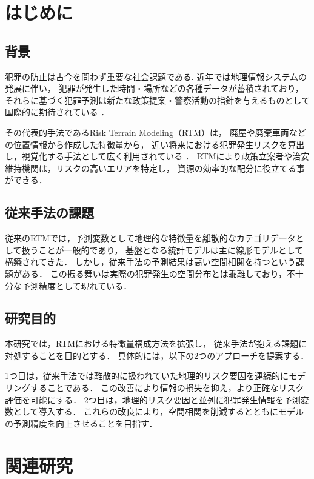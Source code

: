 \section{はじめに}
\subsection{背景}
犯罪の防止は古今を問わず重要な社会課題である.
近年では地理情報システムの発展に伴い，
犯罪が発生した時間・場所などの各種データが蓄積されており\cite{ChicagoDataPortal}，
それらに基づく犯罪予測は新たな政策提案・警察活動の指針を与えるものとして国際的に期待されている
\cite{犯罪予測}．

その代表的手法であるRisk Terrain Modeling（RTM）\cite{caplan2015risk}は，
廃屋や廃棄車両などの位置情報から作成した特徴量から，
近い将来における犯罪発生リスクを算出し，視覚化する手法として広く利用されている
\cite{地理的犯罪予測研究の潮流}．
RTMにより政策立案者や治安維持機関は，リスクの高いエリアを特定し，
資源の効率的な配分に役立てる事ができる\cite{犯罪予測}．

\subsection{従来手法の課題}
従来のRTMでは，予測変数として地理的な特徴量を離散的なカテゴリデータとして扱うことが一般的であり，
基盤となる統計モデルは主に線形モデルとして構築されてきた．
しかし，従来手法の予測結果は高い空間相関を持つという課題がある．
この振る舞いは実際の犯罪発生の空間分布とは乖離しており，不十分な予測精度として現れている．
\subsection{研究目的}
本研究では，RTMにおける特徴量構成方法を拡張し，
従来手法が抱える課題に対処することを目的とする．
具体的には，以下の2つのアプローチを提案する．

1つ目は，従来手法では離散的に扱われていた地理的リスク要因を連続的にモデリングすることである．
この改善により情報の損失を抑え，より正確なリスク評価を可能にする． 
2つ目は，地理的リスク要因と並列に犯罪発生情報を予測変数として導入する．
これらの改良により，空間相関を削減するとともにモデルの予測精度を向上させることを目指す．

\section{関連研究}
\label{chapter_2}
